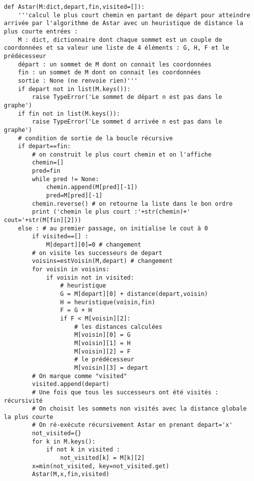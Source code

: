 \begin{lstlisting}
def Astar(M:dict,depart,fin,visited=[]):
    '''calcul le plus court chemin en partant de départ pour atteindre arrivée par l'algorithme de Astar avec un heuristique de distance la plus courte entrées :
    M : dict, dictionnaire dont chaque sommet est un couple de coordonnées et sa valeur une liste de 4 éléments : G, H, F et le prédécesseur
    départ : un sommet de M dont on connait les coordonnées
    fin : un sommet de M dont on connait les coordonnées
    sortie : None (ne renvoie rien)'''
    if depart not in list(M.keys()):
        raise TypeError('Le sommet de départ n est pas dans le graphe')
    if fin not in list(M.keys()):
        raise TypeError('Le sommet d arrivée n est pas dans le graphe')
    # condition de sortie de la boucle récursive
    if depart==fin:
        # on construit le plus court chemin et on l'affiche
        chemin=[]
        pred=fin
        while pred != None:
            chemin.append(M[pred][-1])
            pred=M[pred][-1]
        chemin.reverse() # on retourne la liste dans le bon ordre
        print ('chemin le plus court :'+str(chemin)+' cout='+str(M[fin][2]))
    else : # au premier passage, on initialise le cout à 0
        if visited==[] :
            M[depart][0]=0 # changement
        # on visite les successeurs de depart
        voisins=estVoisin(M,depart) # changement
        for voisin in voisins:
            if voisin not in visited:
                # heuristique
                G = M[depart][0] + distance(depart,voisin)
                H = heuristique(voisin,fin)
                F = G + H
                if F < M[voisin][2]:
                    # les distances calculées
                    M[voisin][0] = G
                    M[voisin][1] = H
                    M[voisin][2] = F
                    # le prédécesseur
                    M[voisin][3] = depart
        # On marque comme "visited"
        visited.append(depart)
        # Une fois que tous les successeurs ont été visités : récursivité
        # On choisit les sommets non visités avec la distance globale la plus courte
        # On ré-exécute récursivement Astar en prenant depart='x'
        not_visited={}
        for k in M.keys():
            if not k in visited :
                not_visited[k] = M[k][2]
        x=min(not_visited, key=not_visited.get)
        Astar(M,x,fin,visited)
\end{lstlisting}


